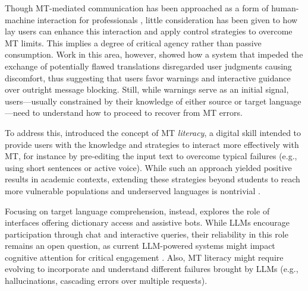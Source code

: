 
Though MT-mediated communication has been approached as a form of human-machine interaction for professionals \citep{green2015natural,o2012translation}, 
little consideration has been given to how lay users can enhance this interaction and apply control strategies to overcome MT limits.
This implies a degree of critical agency rather than passive consumption. 
Work in this area, however, showed how a system that impeded the exchange of potentially flawed translations  disregarded user judgments causing discomfort, thus suggesting that users favor warnings and interactive guidance over outright message blocking. Still, while warnings serve as an initial signal, users---usually constrained by their knowledge of either source or target language---need to understand how to proceed to recover from MT errors.

To address this, \citet{bowker2019towards} introduced the concept of MT \textit{literacy}, a digital skill intended to provide users with the knowledge and strategies to interact more effectively with MT, for instance by pre-editing 
the input text to overcome typical failures (e.g., using short sentences or active voice). While such an approach yielded positive results in academic contexts, extending these strategies beyond students to reach more vulnerable populations and underserved languages is nontrivial \citep{Liebling}.

Focusing on target language comprehension, instead, \citep{robertson} explores the role of interfaces offering dictionary access and assistive bots. 
While LLMs encourage participation through chat and interactive queries, their reliability in this role remains an open question, as current LLM-powered systems  might impact cognitive attention for critical engagement \cite{}. Also, MT literacy might require evolving to incorporate and understand different failures brought by LLMs (e.g., hallucinations, cascading errors over multiple requests). 





